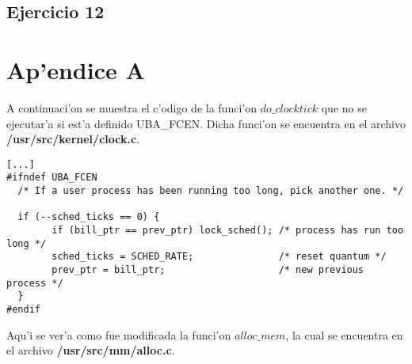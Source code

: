 \subsection{Ejercicio 12}

\clearpage
\section{Ap'endice A}
A continuaci'on se muestra el c'odigo de la funci'on $do\_clocktick$ que no se ejecutar'a si est'a definido UBA\_FCEN. Dicha funci'on se encuentra en el archivo \textbf{/usr/src/kernel/clock.c}.

\begin{verbatim}
[...]
#ifndef UBA_FCEN
  /* If a user process has been running too long, pick another one. */

  if (--sched_ticks == 0) {
        if (bill_ptr == prev_ptr) lock_sched(); /* process has run too long */
        sched_ticks = SCHED_RATE;               /* reset quantum */
        prev_ptr = bill_ptr;                    /* new previous process */
  }
#endif
\end{verbatim}



Aqu'i se ver'a como fue modificada la funci'on $alloc\_mem$, la cual se encuentra en el archivo \textbf{/usr/src/mm/alloc.c}.

